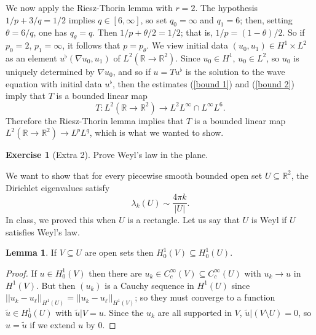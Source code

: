 \documentclass[10pt]{article}
\newcommand{\RR}{\mathbb{R}}
\theoremstyle{definition}
\newtheorem{exer}{Exercise}
\newtheorem{lemma}{Lemma}[exer]
\begin{document}
We now apply the Riesz-Thorin lemma with $r = 2$.
The hypothesis $1/p + 3/q = 1/2$ implies $q \in [6, \infty]$, so set $q_0 = \infty$ and $q_1 = 6$; then, setting $\theta = 6/q$, one has $q_\theta = q$.
Then $1/p + \theta/2 = 1/2$; that is, $1/p = (1-\theta)/2$. So if $p_0 = 2$, $p_1 = \infty$, it follows that $p = p_\theta$.
We view initial data $(u_0, u_1) \in H^1 \times L^2$ as an element $u^\flat (\nabla u_0, u_1)$ of $L^2(\RR \to \RR^2)$.
Since $u_0 \in H^1$, $u_0 \in L^2$, so $u_0$ is uniquely determined by $\nabla u_0$, and so if $u = Tu^\flat$ is the solution to the wave equation with initial data $u^\flat$, then the estimates (\ref{bound 1}) and (\ref{bound 2}) imply that $T$ is a bounded linear map
$$T: L^2(\RR \to \RR^2) \to L^2L^\infty \cap L^\infty L^6.$$
Therefore the Riesz-Thorin lemma implies that $T$ is a bounded linear map $L^2(\RR \to \RR^2) \to L^pL^q$, which is what we wanted to show.

\begin{exer}[Extra 2]
Prove Weyl's law in the plane.
\end{exer}

We want to show that for every piecewise smooth bounded open set $U \subseteq \RR^2$, the Dirichlet eigenvalues satisfy
$$\lambda_k(U) \sim \frac{4\pi k}{|U|}.$$
In class, we proved this when $U$ is a rectangle. Let us say that $U$ is Weyl if $U$ satisfies Weyl's law.
\begin{lemma}
\label{monotonicity of H1}
If $V \subseteq U$ are open sets then $H^1_0(V) \subseteq H^1_0(U)$.
\end{lemma}
\begin{proof}
If $u \in H^1_0(V)$ then there are $u_k \in C^\infty_c(V) \subseteq C^\infty_c(U)$ with $u_k \to u$ in $H^1(V)$. But then $(u_k)$ is a Cauchy sequence in $H^1(U)$ since $||u_k - u_\ell||_{H^1(U)} = ||u_k - u_\ell||_{H^1(V)}$; so they must converge to a function $\tilde u \in H^1_0(U)$ with $\tilde u|V = u$.
Since the $u_k$ are all supported in $V$, $\tilde u|(V \setminus U) = 0$, so $u = \tilde u$ if we extend $u$ by $0$.
\end{proof}
\end{document}
